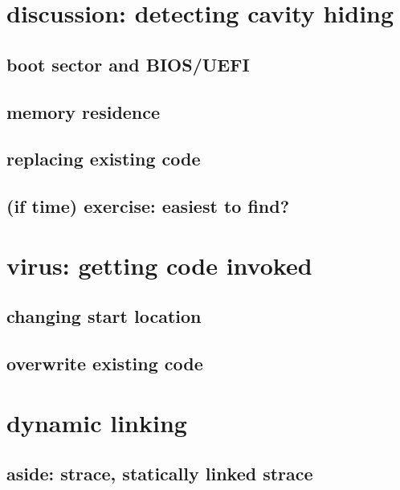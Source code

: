 \section{discussion: detecting cavity hiding}


\subsection{boot sector and BIOS/UEFI}


\subsection{memory residence}

\subsection{replacing existing code}

\subsection{(if time) exercise: easiest to find?}


\section{virus: getting code invoked}


\subsection{changing start location}


\subsection{overwrite existing code}


\section{dynamic linking}


\subsection{aside: strace, statically linked strace}


